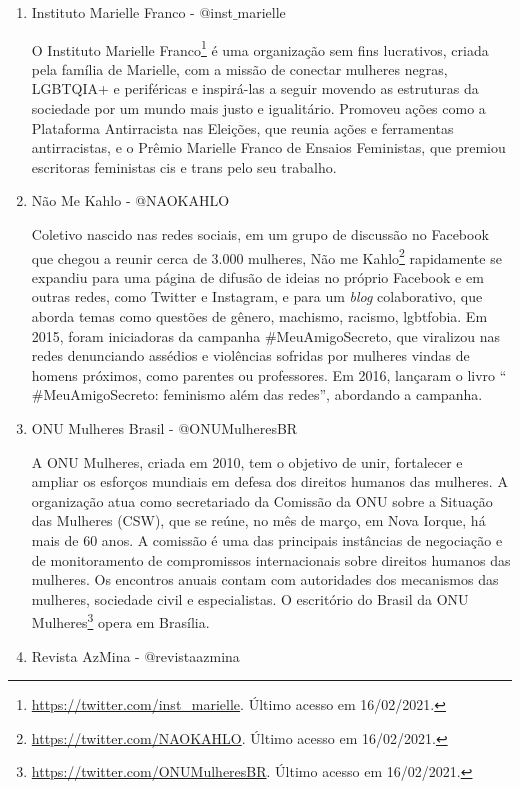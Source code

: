 \documentclass[
	12pt,				%
	openright,			%
	twoside,			%
	a4paper,			%
	english,			%
	brazil				%
	]{abntex2}
\begin{document}
\begin{anexosenv}
\begin{enumerate}
 \item Instituto Marielle Franco - @inst$\_$marielle
 
 O Instituto Marielle Franco\footnote{\url{https://twitter.com/inst_marielle}. Último acesso em 16/02/2021.} é uma organização sem fins lucrativos, criada pela família de Marielle, com a missão de conectar mulheres negras, LGBTQIA+ e periféricas e inspirá-las a seguir movendo as estruturas da sociedade por um mundo mais justo e igualitário. Promoveu ações como a Plataforma Antirracista nas Eleições, que reunia ações e ferramentas antirracistas, e o Prêmio Marielle Franco de Ensaios Feministas, que premiou escritoras feministas cis e trans pelo seu trabalho.
 
 \item Não Me Kahlo - @NAOKAHLO
 
 Coletivo nascido nas redes sociais, em um grupo de discussão no Facebook que chegou a reunir cerca de 3.000 mulheres, Não me Kahlo\footnote{\url{https://twitter.com/NAOKAHLO}. Último acesso em 16/02/2021.} rapidamente se expandiu para uma página de difusão de ideias no próprio Facebook e em outras redes, como Twitter e Instagram, e para um \textit{blog} colaborativo, que aborda temas como questões de gênero, machismo, racismo, lgbtfobia. Em 2015, foram iniciadoras da campanha $\#$MeuAmigoSecreto, que viralizou nas redes denunciando assédios e violências sofridas por mulheres vindas de homens próximos, como parentes ou professores. Em 2016, lançaram o livro ``$\#$MeuAmigoSecreto: feminismo além das redes'', abordando a campanha.

 \item ONU Mulheres Brasil - @ONUMulheresBR
 
 A ONU Mulheres, criada em 2010, tem o objetivo de unir, fortalecer e ampliar os esforços mundiais em defesa dos direitos humanos das mulheres. A organização atua como secretariado da Comissão da ONU sobre a Situação das Mulheres (CSW), que se reúne, no mês de março, em Nova Iorque, há mais de 60 anos. A comissão é uma das principais instâncias de negociação e de monitoramento de compromissos internacionais sobre direitos humanos das mulheres. Os encontros anuais contam com autoridades dos mecanismos das mulheres, sociedade civil e especialistas. O escritório do Brasil da ONU Mulheres\footnote{\url{https://twitter.com/ONUMulheresBR}. Último acesso em 16/02/2021.} opera em Brasília.

 \item Revista AzMina - @revistaazmina
 

\end{enumerate}
\end{anexosenv}
\end{document}
